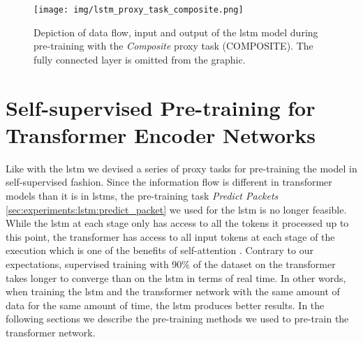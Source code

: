 \begin{figure}[]
	\centering
	\texttt{[image: img/lstm\_proxy\_task\_composite.png]}
	\caption{Depiction of data flow, input and output of the \gls{lstm} model during pre-training with the \textit{Composite} proxy task (COMPOSITE). The fully connected layer is omitted from the graphic. }
	\label{fig:experiments:unsupervised_lstm_composite}
\end{figure}	

\FloatBarrier

\section{Self-supervised Pre-training for Transformer Encoder Networks} \label{sec:experiments:transformer}

Like with the \gls{lstm} we devised a series of proxy tasks for pre-training the model in self-supervised fashion. Since the information flow is different in transformer models than it is in \glspl{lstm}, the pre-training task \textit{Predict Packets} \ref{sec:experiments:lstm:predict_packet} we used for the \gls{lstm} is no longer feasible. While the \gls{lstm} at each stage only has access to all the tokens it processed up to this point, the transformer has access to all input tokens at each stage of the execution which is one of the benefits of self-attention \cite{attention}. Contrary to our expectations, supervised training with 90\% of the dataset on the transformer takes longer to converge than on the \gls{lstm} in terms of real time. In other words, when training the \gls{lstm} and the transformer network with the same amount of data for the same amount of time, the \gls{lstm} produces better results. In the following sections we describe the pre-training methods we used to pre-train the transformer network.

